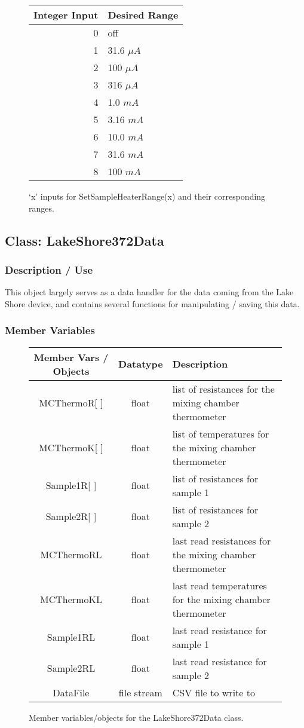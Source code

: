 \documentclass{article}
\begin{document}
\begin{figure}[H]
\centering
\begin{tabular}{r | l }
Integer Input & Desired Range \\ \hline \hline
0 & off \\
1 & 31.6 $\mu A$ \\
2 & 100 $\mu A$\\
3 & 316 $\mu A$\\
4 & 1.0 $mA$ \\
5 & 3.16 $mA$\\
6 & 10.0 $mA$\\
7 & 31.6 $mA$ \\
8 & 100 $mA$\\
\end{tabular}
\label{fig:range}
\caption{`x' inputs for SetSampleHeaterRange(x) and their corresponding ranges.}
\end{figure}


\subsection{Class: LakeShore372Data}
\subsubsection{Description / Use}
This object largely serves as a data handler for the data coming from the Lake Shore device, and contains several functions for manipulating / saving this data.
\subsubsection{Member Variables}
\begin{figure}[H]
\centering\begin{tabular}{c | c | l }
Member Vars / Objects & Datatype & Description \\ \hline \hline
MCThermoR[ ]& float & list of resistances for the mixing chamber thermometer \\
MCThermoK[ ]& float & list of temperatures for the mixing chamber thermometer \\
Sample1R[ ] & float & list of resistances for sample 1 \\
Sample2R[ ] & float & list of resistances for sample 2 \\
MCThermoRL& float & last read resistances for the mixing chamber thermometer \\
MCThermoKL& float & last read temperatures for the mixing chamber thermometer \\
Sample1RL& float & last read resistance for sample 1 \\
Sample2RL & float & last read resistance for sample 2 \\
DataFile & file stream & CSV file to write to
\end{tabular}
\caption{Member variables/objects for the LakeShore372Data class.}
\end{figure}
\end{document}

